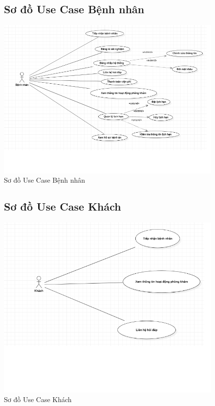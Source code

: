 \documentclass{report}
\begin{document}
\pagebreak
\begin{center}
	\begin{figure}[!htp]
		\subsection{Sơ đồ Use Case Bệnh nhân}
		\begin{center}
			\includegraphics[scale=.6]{Hinh/Sơ đồ Use Case Bệnh nhân}
		\end{center}
		\caption{Sơ đồ Use Case Bệnh nhân}
	\end{figure}
\end{center}

\begin{center}
	\begin{figure}[!htp]
		\subsection{Sơ đồ Use Case Khách}
		\begin{center}
			\includegraphics[scale=.7]{Hinh/Sơ đồ Use Case Khách.png}
		\end{center}
		\caption{Sơ đồ Use Case Khách}
	\end{figure}
\end{center}
\end{document}
